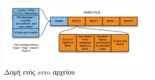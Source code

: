 \begin{figure}[!ht]
	\centering
	\includegraphics[width=0.7\textwidth]{./images/chapter2/avro_file_format.png}
	\caption[Δομή ενός avro αρχείου]{Δομή ενός avro αρχείου}
	\label{fig:avro_file_format}
\end{figure}